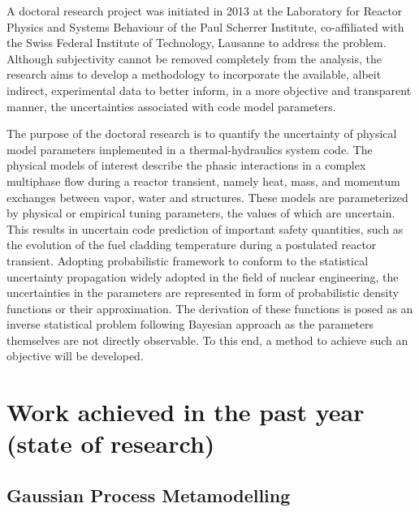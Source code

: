 \documentclass[11pt,titlepage]{article}
\begin{document}
A doctoral research project was initiated in 2013 at the Laboratory for 
Reactor Physics and Systems Behaviour of the Paul Scherrer Institute, 
co-affiliated with the Swiss Federal Institute of Technology, Lausanne 
to address the problem. 
Although subjectivity cannot be removed completely from the analysis,
the research aims to develop  a methodology to incorporate the available, 
albeit indirect, experimental data to better inform, in a more objective 
and transparent manner, the uncertainties associated with code model parameters.

The purpose of the doctoral research is to quantify the uncertainty of physical 
model parameters implemented in a thermal-hydraulics system code. 
The physical models of interest describe the phasic interactions in a complex 
multiphase flow during a reactor transient, namely heat, mass, and momentum 
exchanges between vapor, water and structures. 
These models are parameterized 
by physical or empirical tuning parameters, the values of which are uncertain. 
This results in uncertain code prediction of important safety quantities, such 
as the evolution of the fuel cladding temperature during a postulated reactor 
transient.
Adopting probabilistic framework to conform to the statistical uncertainty 
propagation widely adopted in the field of nuclear engineering, 
the uncertainties in the parameters are represented in form of probabilistic 
density functions or their approximation. The derivation of these functions 
is posed as an inverse statistical problem following Bayesian approach as 
the parameters themselves are not directly observable. 
To this end, a method to achieve such an objective will be developed.

\section{Work achieved in the past year (state of research)}

\subsection{Gaussian Process Metamodelling}
\end{document}
